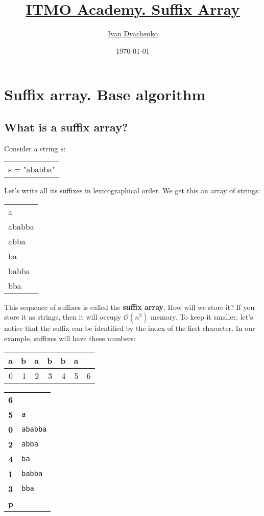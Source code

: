 \documentclass[11pt]{article}
\author{\href{http://ivandyachenko.io/}{Ivan Dyachenko}}
\date{\today}
\title{\href{https://codeforces.com/edu/course/2/lesson/2}{ITMO Academy. Suffix Array}}
\begin{document}
\maketitle
\tableofcontents


\section{Suffix array. Base algorithm}
\label{sec:org44b94b2}

\subsection{What is a suffix array?}
\label{sec:org2da6791}
Consider a string \(s\):
\begin{center}
\begin{tabular}{l}
s = "ababba"\\
\end{tabular}
\end{center}

Let's write all its suffixes in lexicographical order. We get this an array of strings:
\begin{center}
\begin{tabular}{l}
a\\
ababba\\
abba\\
ba\\
babba\\
bba\\
\end{tabular}
\end{center}

This sequence of suffixes is called the \textbf{suffix array}. How will we store it? If you store it as
strings, then it will occupy \(\mathcal{O}(n^2)\) memory. To keep it smaller, let's notice that the suffix can
be identified by the index of the first character. In our example, suffixes will have these
numbers:
\begin{center}
\begin{tabular}{rrrrrrr}
\textbf{a} & \textbf{b} & \textbf{a} & \textbf{b} & \textbf{b} & \textbf{a} & \\
\hline
0 & 1 & 2 & 3 & 4 & 5 & 6\\
\end{tabular}
\end{center}

\begin{center}
\begin{tabular}{ll}
\textbf{6} & \\
\textbf{5} & \texttt{a}\\
\textbf{0} & \texttt{ababba}\\
\textbf{2} & \texttt{abba}\\
\textbf{4} & \texttt{ba}\\
\textbf{1} & \texttt{babba}\\
\textbf{3} & \texttt{bba}\\
\textbf{p} & \\
\end{tabular}
\end{center}
\end{document}

